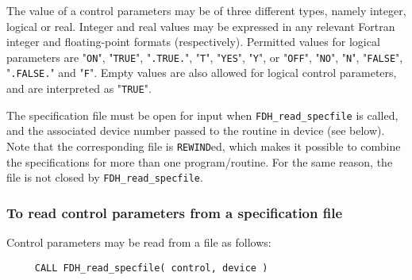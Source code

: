\documentclass{galahad}
\newcommand{\packagename}{FDH}
\begin{document}
The value of a control parameters may be of three different types, namely
integer, logical or real.
Integer and real values may be expressed in any relevant Fortran integer and
floating-point formats (respectively). Permitted values for logical
parameters are "{\tt ON}", "{\tt TRUE}", "{\tt .TRUE.}", "{\tt T}", 
"{\tt YES}", "{\tt Y}", or "{\tt OFF}", "{\tt NO}",
"{\tt N}", "{\tt FALSE}", "{\tt .FALSE.}" and "{\tt F}". 
Empty values are also allowed for 
logical control parameters, and are interpreted as "{\tt TRUE}".  

The specification file must be open for 
input when {\tt \packagename\_read\_specfile}
is called, and the associated device number 
passed to the routine in device (see below). 
Note that the corresponding 
file is {\tt REWIND}ed, which makes it possible to combine the specifications 
for more than one program/routine.  For the same reason, the file is not
closed by {\tt \packagename\_read\_specfile}.

\subsubsection{To read control parameters from a specification file}
\label{readspec}

Control parameters may be read from a file as follows:
\hskip0.5in 
\def\baselinestretch{0.8} {\tt \begin{verbatim}
     CALL FDH_read_specfile( control, device )
\end{verbatim}
}
\def\baselinestretch{1.0}
\end{document}
